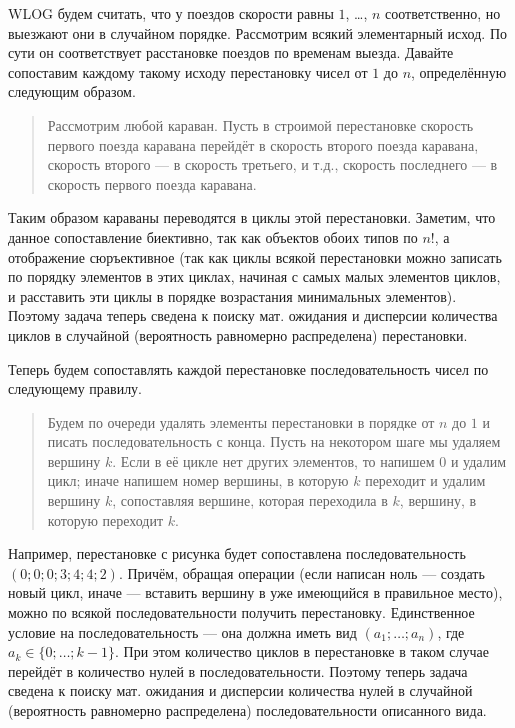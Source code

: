 \documentclass[12pt,a4paper]{article}
\begin{document}
    \begin{enumproblem}
        WLOG будем считать, что у поездов скорости равны $1$, \dots, $n$ соответственно, но выезжают они в случайном порядке. Рассмотрим всякий элементарный исход. По сути он соответствует расстановке поездов по временам выезда. Давайте сопоставим каждому такому исходу перестановку чисел от $1$ до $n$, определённую следующим образом.
        \begin{figure}[h]
            \centering
            \Large
        \end{figure}
        \begin{quotation}
            Рассмотрим любой караван. Пусть в строимой перестановке скорость первого поезда каравана перейдёт в скорость второго поезда каравана, скорость второго --- в скорость третьего, и т.д., скорость последнего --- в скорость первого поезда каравана.
        \end{quotation}
        Таким образом караваны переводятся в циклы этой перестановки. Заметим, что данное сопоставление биективно, так как объектов обоих типов по $n!$, а отображение сюръективное (так как циклы всякой перестановки можно записать по порядку элементов в этих циклах, начиная с самых малых элементов циклов, и расставить эти циклы в порядке возрастания минимальных элементов). Поэтому задача теперь сведена к поиску мат. ожидания и дисперсии количества циклов в случайной (вероятность равномерно распределена) перестановки.

        Теперь будем сопоставлять каждой перестановке последовательность чисел по следующему правилу.
        \begin{quotation}
            Будем по очереди удалять элементы перестановки в порядке от $n$ до $1$ и писать последовательность с конца. Пусть на некотором шаге мы удаляем вершину $k$. Если в её цикле нет других элементов, то напишем $0$ и удалим цикл; иначе напишем номер вершины, в которую $k$ переходит и удалим вершину $k$, сопоставляя вершине, которая переходила в $k$, вершину, в которую переходит $k$.
        \end{quotation}
        Например, перестановке с рисунка будет сопоставлена последовательность $(0; 0; 0; 3; 4; 4; 2)$. Причём, обращая операции (если написан ноль --- создать новый цикл, иначе --- вставить вершину в уже имеющийся в правильное место), можно по всякой последовательности получить перестановку. Единственное условие на последовательность --- она должна иметь вид $(a_1; \dots; a_n)$, где $a_k \in \{0; \dots; k-1\}$. При этом количество циклов в перестановке в таком случае перейдёт в количество нулей в последовательности. Поэтому теперь задача сведена к поиску мат. ожидания и дисперсии количества нулей в случайной (вероятность равномерно распределена) последовательности описанного вида.


\end{enumproblem}
\end{document}
